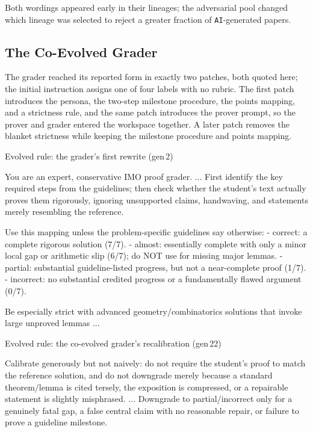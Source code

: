 \documentclass{paper}
\newcommand{\AI}{\texttt{AI}}
\begin{document}
Both wordings appeared early in their lineages; the adversarial pool changed which lineage was selected to reject a greater fraction of \AI-generated papers.

\subsection{The Co-Evolved Grader}
\label{app:evaluator-evolution:grader}

The grader reached its reported form in exactly two patches, both quoted here; the initial instruction assigns one of four labels with no rubric. The first patch introduces the persona, the two-step milestone procedure, the points mapping, and a strictness rule, and the same patch introduces the prover prompt, so the prover and grader entered the workspace together. A later patch removes the blanket strictness while keeping the milestone procedure and points mapping.

\begin{promptbox}{Evolved rule: the grader's first rewrite (gen\,2)}
\begin{PromptVerb}
You are an expert, conservative IMO proof grader. ... First identify
the key required steps from the guidelines; then check whether the
student's text actually proves them rigorously, ignoring unsupported
claims, handwaving, and statements merely resembling the reference.

Use this mapping unless the problem-specific guidelines say otherwise:
- correct: a complete rigorous solution (7/7).
- almost: essentially complete with only a minor local gap or
  arithmetic slip (6/7); do NOT use for missing major lemmas.
- partial: substantial guideline-listed progress, but not a
  near-complete proof (1/7).
- incorrect: no substantial credited progress or a fundamentally
  flawed argument (0/7).

Be especially strict with advanced geometry/combinatorics solutions
that invoke large unproved lemmas ...
\end{PromptVerb}
\end{promptbox}

\begin{promptbox}{Evolved rule: the co-evolved grader's recalibration (gen\,22)}
\begin{PromptVerb}
Calibrate generously but not naively: do not require the student's
proof to match the reference solution, and do not downgrade merely
because a standard theorem/lemma is cited tersely, the exposition is
compressed, or a repairable statement is slightly misphrased. ...
Downgrade to partial/incorrect only for a genuinely fatal gap, a false
central claim with no reasonable repair, or failure to prove a
guideline milestone.
\end{PromptVerb}
\end{promptbox}
\end{document}
